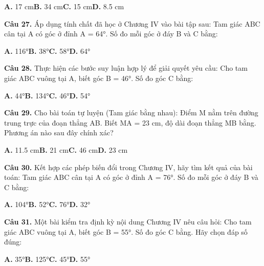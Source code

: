 \documentclass[11pt,a4paper]{article}
\begin{document}
\hspace*{1.5em}\textbf{A.} 17 cm\quad\quad \textbf{B.} 34 cm\quad\quad \textbf{C.} 15 cm\quad\quad \textbf{D.} 8.5 cm\par\vspace{2pt}
\textbf{\color{primary} Câu 27.} Áp dụng tính chất đã học ở Chương IV vào bài tập sau: Tam giác ABC cân tại A có góc ở đỉnh A = 64°. Số đo mỗi góc ở đáy B và C bằng:\par
\hspace*{1.5em}\textbf{A.} 116°\quad\quad \textbf{B.} 38°\quad\quad \textbf{C.} 58°\quad\quad \textbf{D.} 64°\par\vspace{2pt}
\textbf{\color{primary} Câu 28.} Thực hiện các bước suy luận hợp lý để giải quyết yêu cầu: Cho tam giác ABC vuông tại A, biết góc B = 46°. Số đo góc C bằng:\par
\hspace*{1.5em}\textbf{A.} 44°\quad\quad \textbf{B.} 134°\quad\quad \textbf{C.} 46°\quad\quad \textbf{D.} 54°\par\vspace{2pt}
\textbf{\color{primary} Câu 29.} Cho bài toán tự luyện (Tam giác bằng nhau): Điểm M nằm trên đường trung trực của đoạn thẳng AB. Biết MA = 23 cm, độ dài đoạn thẳng MB bằng. Phương án nào sau đây chính xác?\par
\hspace*{1.5em}\textbf{A.} 11.5 cm\quad\quad \textbf{B.} 21 cm\quad\quad \textbf{C.} 46 cm\quad\quad \textbf{D.} 23 cm\par\vspace{2pt}
\textbf{\color{primary} Câu 30.} Kết hợp các phép biến đổi trong Chương IV, hãy tìm kết quả của bài toán: Tam giác ABC cân tại A có góc ở đỉnh A = 76°. Số đo mỗi góc ở đáy B và C bằng:\par
\hspace*{1.5em}\textbf{A.} 104°\quad\quad \textbf{B.} 52°\quad\quad \textbf{C.} 76°\quad\quad \textbf{D.} 32°\par\vspace{2pt}
\textbf{\color{primary} Câu 31.} Một bài kiểm tra định kỳ nội dung Chương IV nêu câu hỏi: Cho tam giác ABC vuông tại A, biết góc B = 55°. Số đo góc C bằng. Hãy chọn đáp số đúng:\par
\hspace*{1.5em}\textbf{A.} 35°\quad\quad \textbf{B.} 125°\quad\quad \textbf{C.} 45°\quad\quad \textbf{D.} 55°\par\vspace{2pt}
\end{document}
